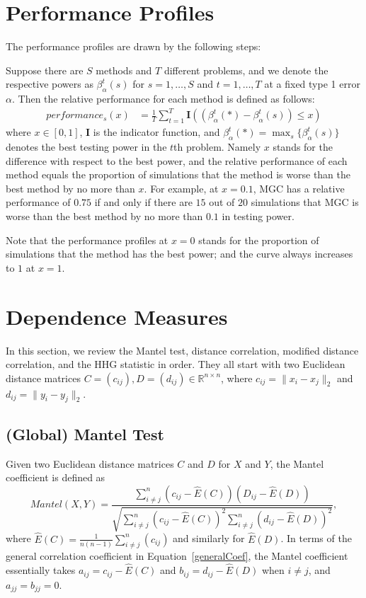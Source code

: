 \documentclass[11pt]{article}
\providecommand{\mb}[1]{\boldsymbol{#1}}
\newcommand{\Real}{\mathbb{R}}
\begin{document}
\section{Performance Profiles}
\label{appen:profiles}
The performance profiles are drawn by the following steps:

Suppose there are $S$ methods and $T$ different problems, and we denote the respective powers as $\beta_{\alpha}^{t}(s)$ for $s=1,\ldots,S$ and $t=1,\ldots,T$ at a fixed type 1 error $\alpha$. Then the relative performance for each method is defined as follows:
\begin{align*}
performance_{s}(x) &= \frac{1}{T} \sum_{t=1}^{T} \mb{I}((\beta_{\alpha}^{t}(*)-\beta_{\alpha}^{t}(s)) \leq x)
\end{align*}
where $x \in [0,1]$, $\mb{I}$ is the indicator function, and $\beta_{\alpha}^{t}(*) =\max_{s} \{\beta_{\alpha}^{t}(s)\}$ denotes the best testing power in the $t$th problem. Namely $x$ stands for the difference with respect to the best power, and the relative performance of each method equals the proportion of simulations that the method is worse than the best method by no more than $x$. For example, at $x=0.1$, MGC has a relative performance of $0.75$ if and only if there are $15$ out of $20$ simulations that MGC is worse than the best method by no more than $0.1$ in testing power. 

Note that the performance profiles at $x=0$ stands for the proportion of simulations that the method has the best power; and the curve always increases to $1$ at $x=1$. 

\section{Dependence Measures}
\label{appen:methods}

In this section, we review the Mantel test, distance correlation, modified distance correlation, and the HHG statistic in order. They all start with two Euclidean distance matrices $C=(c_{ij}), D=(d_{ij}) \in \Real^{n \times n}$, where $c_{ij}=\|x_{i}-x_{j}\|_{2}$ and $d_{ij}=\|y_{i}-y_{j}\|_{2}$. 

\subsection{(Global) Mantel Test}
\label{appen:mantel}
Given two Euclidean distance matrices $C$ and $D$ for $X$ and $Y$, the Mantel coefficient \cite{Mantel1967} is defined as 
\begin{equation}
Mantel(X,Y)=\frac{\sum_{i \neq j}^{n}(c_{ij}-\hat{E}(C))(D_{ij}-\hat{E}(D))}{\sqrt{\sum_{i \neq j}^{n}(c_{ij}-\hat{E}(C))^2 \sum_{i \neq j}^{n}(d_{ij}-\hat{E}(D))^2}},
\end{equation}
where $\hat{E}(C)=\frac{1}{n(n-1)}\sum_{i \neq j}^{n}(c_{ij})$ and similarly for $\hat{E}(D)$. In terms of the general correlation coefficient in Equation~\ref{generalCoef}, the Mantel coefficient essentially takes $a_{ij}=c_{ij}-\hat{E}(C)$ and $b_{ij}=d_{ij}-\hat{E}(D)$ when $i \neq j$, and $a_{jj}=b_{jj}=0$.
\end{document}
